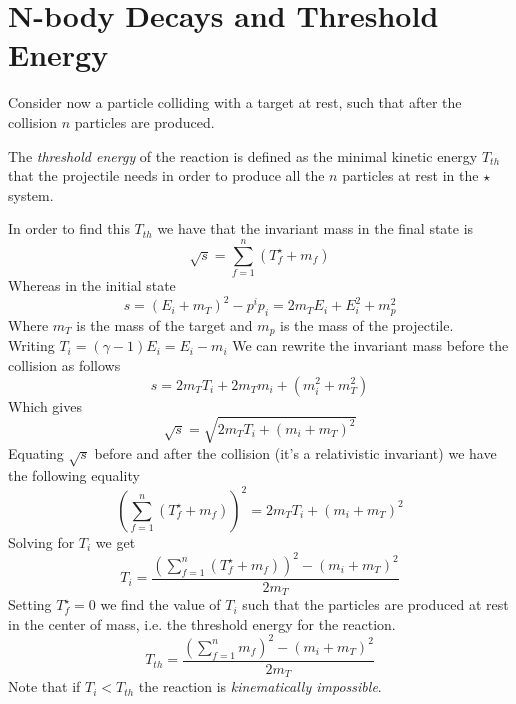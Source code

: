 \documentclass[../admech.tex]{subfiles}
\begin{document}
\section{N-body Decays and Threshold Energy}
Consider now a particle colliding with a target at rest, such that after the collision $n$ particles are produced.
\begin{dfn}
	The \emph{threshold energy} of the reaction is defined as the minimal kinetic energy $T_{th}$ that the projectile needs in order to produce all the $n$ particles at rest in the $\star$ system.
\end{dfn}
In order to find this $T_{th}$ we have that the invariant mass in the final state is
\begin{equation}
	\sqrt{s}=\sum_{f=1}^n\left( T_f^\star+m_f \right)
	\label{eq:invmassnbodyprod}
\end{equation}
Whereas in the initial state
\begin{equation}
	s=\left( E_i+m_T \right)^2-p^ip_i=2m_TE_i+E_i^2+m_p^2
	\label{eq:invmassnbodyprodpre}
\end{equation}
Where $m_T$ is the mass of the target and $m_p$ is the mass of the projectile.\\
Writing $T_i=(\gamma-1)E_i=E_i-m_i$ We can rewrite the invariant mass before the collision as follows
\begin{equation*}
	s=2m_TT_i+2m_Tm_i+(m_i^2+m_T^2)
\end{equation*}
Which gives
\begin{equation}
	\sqrt{s}=\sqrt{2m_TT_i+(m_i+m_T)^2}
	\label{eq:sqrtspreT}
\end{equation}
Equating $\sqrt{s}$ before and after the collision (it's a relativistic invariant) we have the following equality
\begin{equation}
	\left( \sum_{f=1}^n\left( T_f^\star+m_f \right) \right)^2=2m_TT_i+(m_i+m_T)^2
	\label{eq:Tisqrtspreaf}
\end{equation}
Solving for $T_i$ we get
\begin{equation}
	T_i=\frac{\left( \sum_{f=1}^n(T_f^\star+m_f) \right)^2-(m_i+m_T)^2}{2m_T}
	\label{eq:kinnecessarysqrts}
\end{equation}
Setting $T_f^\star=0$ we find the value of $T_i$ such that the particles are produced at rest in the center of mass, i.e. the threshold energy for the reaction.
\begin{equation}
	T_{th}=\frac{\left( \sum_{f=1}^nm_f \right)^2-(m_i+m_T)^2}{2m_T}
	\label{eq:thresholdenergygeneral}
\end{equation}
Note that if $T_i<T_{th}$ the reaction is \textit{kinematically impossible}.
\end{document}
